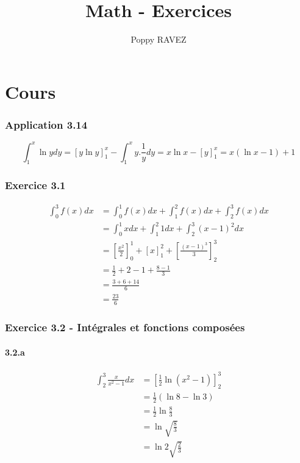 \documentclass[a4paper,10pt]{report}
\title{Math - Exercices}
\author{Poppy RAVEZ}
\begin{document}
\chapter{Cours}

\subsection*{Application 3.14}
\begin{displaymath}
	\int_1^x \ln y dy = [y\ln y]_1^x -\int_1^x y.\frac{1}{y}dy = x \ln x - [y]_1^x = x(\ln x -1) + 1
\end{displaymath}

\subsection*{Exercice 3.1}
\begin{equation*}
	\begin{split}
	\int_0^3 f(x)dx &= \int_0^1 f(x)dx + \int_1^2 f(x)dx +\int_2^3 f(x)dx\\
	                &= \int_0^1 x dx + \int_1^2 1 dx + \int_2^3 (x-1)^2dx \\
	                &= \left[ \frac{x^2}{2} \right]_0^1 +  \left[ x \right]_1^2 + \left[ \frac{(x-1)^3}{3} \right]_2^3 \\
	                &= \frac{1}{2} + 2 - 1 + \frac{8-1}{3} \\
	                &= \frac{3+6+14}{6} \\
	                &= \frac{23}{6}
	\end{split}
\end{equation*}

\subsection*{Exercice 3.2 - Intégrales et fonctions composées}

\subsubsection*{3.2.a}
\begin{equation*}
	\begin{split}
		\int_2^3 \frac{x}{x^2-1}dx &= \left[ \frac{1}{2}\ln(x^2-1) \right]_2^3\\
			                       &= \frac{1}{2} (\ln 8 - \ln 3) \\
			                       &= \frac{1}{2} \ln \frac{8}{3} \\
			                       &= \ln \sqrt{\frac{8}{3}} \\
			                       &= \ln 2\sqrt{\frac{2}{3}}
	\end{split}
\end{equation*}
\end{document}
